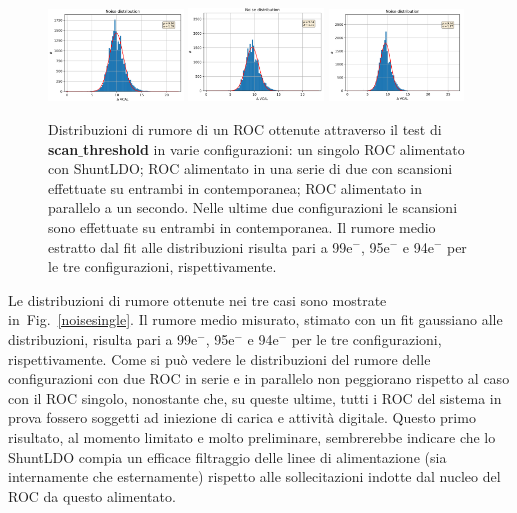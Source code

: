 \begin{figure}[h]
\centering
\includegraphics[width=0.32\textwidth]{Immagini/NoiseSingle}
\hfill
\includegraphics[width=0.32\textwidth]{Immagini/NoiseSerial}
\hfill
\includegraphics[width=0.32\textwidth]{Immagini/NoiseParallel}
\caption{Distribuzioni di rumore di un ROC ottenute attraverso il test di \textbf{scan$\_$threshold} in varie configurazioni: un singolo ROC alimentato con ShuntLDO; ROC alimentato in una serie di due con scansioni effettuate su entrambi in contemporanea; ROC alimentato in parallelo a un secondo. Nelle ultime due configurazioni le scansioni sono effettuate su entrambi in contemporanea. Il rumore medio estratto dal fit alle distribuzioni risulta pari a 99e$^-$, 95e$^-$ e 94e$^-$ per le tre configurazioni, rispettivamente.}
\label{noisesingle}
\label{noiseserial}
\label{noiseparallel}
\end{figure}

Le distribuzioni di rumore ottenute nei tre casi sono mostrate in~Fig.~\ref{noisesingle}. Il rumore medio misurato, stimato con un fit gaussiano alle distribuzioni, risulta pari a 99e$^-$, 95e$^-$ e 94e$^-$ per le tre configurazioni, rispettivamente. Come si può vedere le distribuzioni del rumore delle configurazioni con due ROC in serie e in parallelo non peggiorano rispetto al caso con il ROC singolo, nonostante che, su queste ultime, tutti i ROC del sistema in prova fossero soggetti ad iniezione di carica e attività digitale. Questo primo risultato, al momento limitato e molto preliminare, sembrerebbe indicare che lo ShuntLDO compia un efficace filtraggio delle linee di alimentazione (sia internamente che esternamente) rispetto alle sollecitazioni indotte dal nucleo del ROC da questo alimentato.

